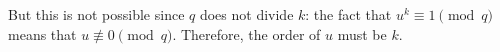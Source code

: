 But this is not possible since $q$ does not divide ${k}$: the fact that ${u}^{{k}}\equiv 1\pmod{q}$ means that ${u}\not\equiv 0\pmod{q}$. Therefore, the order of ${u}$ must be ${k}$.